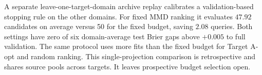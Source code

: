 \documentclass{article}
\begin{document}
A separate leave-one-target-domain archive replay calibrates a validation-based stopping rule on the other domains. For fixed MMD ranking it evaluates $47.92$ candidates on average versus 50 for the fixed budget, saving $2.08$ queries. Both settings have zero of six domain-average test Brier gaps above $+0.005$ to full validation. The same protocol uses more fits than the fixed budget for Target A-opt and random ranking. This single-projection comparison is retrospective and shares source pools across targets. It leaves prospective budget selection open.



\end{document}
